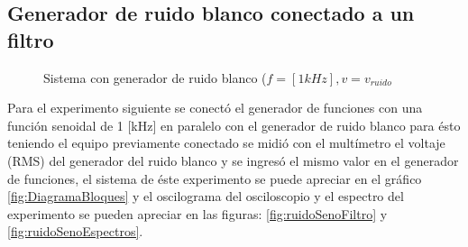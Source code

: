 \documentclass{article}
\begin{document}
\subsection{Generador de ruido blanco conectado a un filtro}


\begin{figure}[h!]
    \centering
    \caption{Sistema con generador de ruido blanco ($f=[1kHz],v=v_{ruido}$}
    \label{fig:sistRuidoBlanco}
\end{figure}


Para el experimento siguiente se conectó el generador de funciones con una función senoidal de 1 [kHz] en paralelo con el generador de ruido blanco para ésto teniendo el equipo previamente conectado se midió con el multímetro el voltaje (RMS) del generador del ruido blanco y se ingresó el mismo valor en el generador de funciones, el sistema de éste experimento se puede apreciar en el gráfico \ref{fig:DiagramaBloques} y el oscilograma del osciloscopio y el espectro del experimento se pueden apreciar en  las figuras: \ref{fig:ruidoSenoFiltro} y \ref{fig:ruidoSenoEspectros}.\\

   
\end{document}
